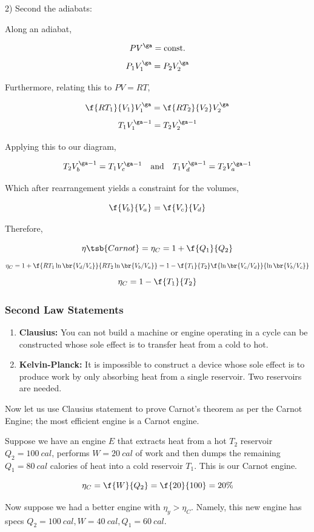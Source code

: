 \documentclass{article}
\begin{document}
2) Second the adiabats:

Along an adiabat,

\[ PV^{\ga} = \text{const.}\]
\[ P_1V_1^{\ga} = P_2V_2^{\ga} \]

Furthermore, relating this to $PV = RT$,

\[ \f{RT_1}{V_1} V_1^{\ga} = \f{RT_2}{V_2} V_2^{\ga} \]
\[ T_1 V_1^{\ga-1} = T_2 V_2^{\ga-1} \]

Applying this to our diagram,

\[ T_2 V_b^{\ga-1} = T_1 V_c^{\ga-1} \quad \text{and} \quad T_1 V_d^{\ga-1} = T_2 V_a^{\ga-1} \]

Which after rearrangement yields a constraint for the volumes,

\[ \f{V_b}{V_a} = \f{V_c}{V_d} \]

Therefore,

\[ \eta\tsb{Carnot} = \eta_C = 1 + \f{Q_1}{Q_2} \]
\[ \eta_C = 1 + \f{RT_1\ln\br{V_d/V_c}}{RT_2\ln\br{V_b/V_a}} = 1 - \f{T_1}{T_2}\f{\ln\br{V_c/V_d}}{\ln\br{V_b/V_c}} \]
\[ \eta_C = 1 - \f{T_1}{T_2} \]

\subsubsection{Second Law Statements}

\begin{enumerate}
    \item \textbf{Clausius:} You can not build a machine or engine operating in a cycle can be constructed whose sole effect is to transfer heat from a cold to hot.
    \item \textbf{Kelvin-Planck:} It is impossible to construct a device whose sole effect is to produce work by only absorbing heat from a single reservoir. Two reservoirs are needed.
\end{enumerate}

Now let us use Clausius statement to prove Carnot's theorem as per the Carnot Engine; the most efficient engine is a Carnot engine.


Suppose we have an engine $E$ that extracts heat from a hot $T_2$ reservoir $Q_2 = \SI{100}{cal}$, performs $W = \SI{20}{cal}$ of work and then dumps the remaining $Q_1 = \SI{80}{cal}$ calories of heat into a cold reservoir $T_1$. This is our Carnot engine.

\[ \eta_C = \f{W}{Q_2} = \f{20}{100} = 20\% \]

Now suppose we had a better engine with $\eta_y > \eta_C$. Namely, this new engine has specs $Q_2 = \SI{100}{cal}, W = \SI{40}{cal}, Q_1 = \SI{60}{cal}$.
\end{document}
